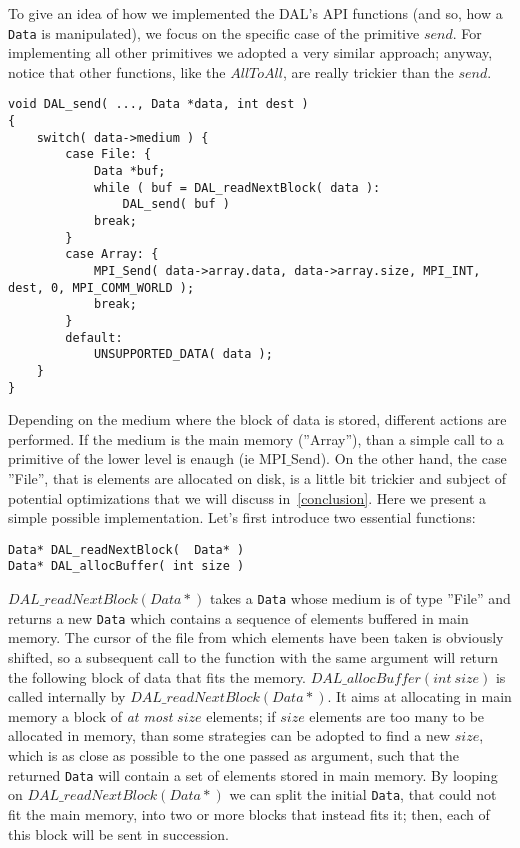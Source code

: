 To give an idea of how we implemented the DAL's API functions (and so, how a \texttt{Data} is manipulated), we focus on the specific case of the primitive $send$. For implementing all other primitives we adopted a very similar approach; anyway, notice that other functions, like the $AllToAll$, are really trickier than the $send$. 
\begin{lstlisting}
void DAL_send( ..., Data *data, int dest )
{
	switch( data->medium ) {
		case File: {
			Data *buf;
			while ( buf = DAL_readNextBlock( data ):
				DAL_send( buf )
			break;
		}
		case Array: {
			MPI_Send( data->array.data, data->array.size, MPI_INT, dest, 0, MPI_COMM_WORLD );
			break;
		}
		default:
			UNSUPPORTED_DATA( data );
	}
}
\end{lstlisting}
Depending on the medium where the block of data is stored, different actions are performed. If the medium is the main memory (''Array''), than a simple call to a primitive of the lower level is enaugh (ie MPI$\_$Send). On the other hand, the case ''File'', that is elements are allocated on disk, is a little bit trickier and subject of potential optimizations that we will discuss in~\ref{conclusion}. Here we present a simple possible implementation. Let's first introduce two essential functions: 
\begin{lstlisting}
Data* DAL_readNextBlock(  Data* )
Data* DAL_allocBuffer( int size )
\end{lstlisting}
$DAL\_readNextBlock( Data* )$ takes a \texttt{Data} whose medium is of type ''File'' and returns a new \texttt{Data} which contains a sequence of elements buffered in main memory. The cursor of the file from which elements have been taken is obviously shifted, so a subsequent call to the function with the same argument will return the following block of data that fits the memory. $DAL\_allocBuffer( int\ size )$ is called internally by $DAL\_readNextBlock( Data* )$. It aims at allocating in main memory a block of \textit{at most} $size$ elements; if $size$ elements are too many to be allocated in memory, than some strategies can be adopted to find a new $size$, which is as close as possible to the one passed as argument, such that the returned \texttt{Data} will contain a set of elements stored in main memory. 
By looping on $DAL\_readNextBlock( Data* )$ we can split the initial \texttt{Data}, that could not fit the main memory, into two or more blocks that instead fits it; then, each of this block will be sent in succession.
